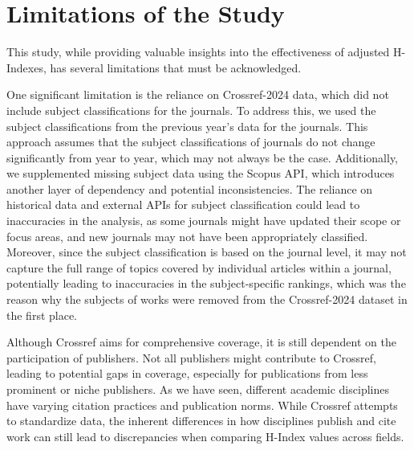 
\section{Limitations of the Study}

This study, while providing valuable insights into the effectiveness of
adjusted H-Indexes, has several limitations that must be acknowledged.

One significant limitation is the reliance on Crossref-2024 data, which did not
include subject classifications for the journals. To address this, we used the
subject classifications from the previous year’s data for the journals. This
approach assumes that the subject classifications of journals do not change
significantly from year to year, which may not always be the case.
Additionally, we supplemented missing subject data using the Scopus API, which
introduces another layer of dependency and potential inconsistencies. The
reliance on historical data and external APIs for subject classification could
lead to inaccuracies in the analysis, as some journals might have updated their
scope or focus areas, and new journals may not have been appropriately
classified. Moreover, since the subject classification is based on the journal
level, it may not capture the full range of topics covered by individual
articles within a journal, potentially leading to inaccuracies in the
subject-specific rankings, which was the reason why the subjects of works were removed from the
Crossref-2024 dataset in the first place.

Although Crossref aims for comprehensive coverage, it is still dependent on the
participation of publishers. Not all publishers might contribute to Crossref,
leading to potential gaps in coverage, especially for publications from less
prominent or niche publishers. As we have seen, different academic disciplines
have varying citation practices and publication norms. While Crossref attempts
to standardize data, the inherent differences in how disciplines publish and
cite work can still lead to discrepancies when comparing H-Index values across
fields.


